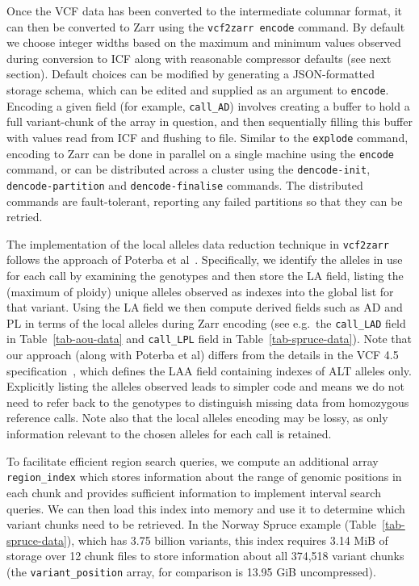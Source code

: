\documentclass[a4paper,num-refs]{oup-contemporary}
\begin{document}
Once the VCF data has been converted to the intermediate columnar format,
it can then be converted to Zarr using the \texttt{vcf2zarr encode}
command. By default we choose integer widths based on the maximum
and minimum values observed during conversion to ICF
along with reasonable compressor defaults (see next section).
Default choices can be
modified by generating a JSON-formatted storage schema,
which can be edited and supplied as an argument to \texttt{encode}.
Encoding a given field (for example, \texttt{call\_AD})
involves creating a buffer to hold a full variant-chunk of the
array in question, and then sequentially filling this buffer with
values read from ICF and flushing to file.
 Similar to the \texttt{explode} command,
encoding to Zarr can be done in parallel on a single
machine using the \texttt{encode} command,
or can be distributed across a cluster using the
\texttt{dencode-init},
\texttt{dencode-partition} and \texttt{dencode-finalise} commands.
The distributed commands are fault-tolerant, reporting any failed
partitions so that they can be retried.

The implementation of the local alleles data reduction technique 
in \texttt{vcf2zarr} follows the approach of Poterba 
et al~\cite{poterba2025scalable}.
Specifically, we identify the alleles in use for each call by
examining the genotypes and then store the LA field,
listing the (maximum of ploidy) unique alleles observed as indexes into the 
global list for that variant.
Using the LA field we then compute derived fields such as 
AD and PL in terms of the local alleles during Zarr encoding
(see e.g.\ the \texttt{call\_LAD} field in Table~\ref{tab-aou-data}
and
\texttt{call\_LPL} field in Table~\ref{tab-spruce-data}).
Note that our approach (along with Poterba et al)
differs from the details in the VCF 4.5 specification~\citep{vcf4_5},
which defines the LAA field containing indexes of ALT 
alleles only. Explicitly listing the alleles observed leads
to simpler code and means we do not need to refer back to the 
genotypes to distinguish missing data from homozygous reference 
calls. Note also that the local alleles encoding may be lossy,
as only information relevant to the chosen alleles for 
each call is retained.

To facilitate efficient region search queries, we compute an
additional array \texttt{region\_index} which stores information
about the range of genomic positions in each chunk
and provides sufficient information to implement interval
search queries. We can then load this index into memory and 
use it to determine which variant chunks need to be retrieved.
In the Norway Spruce example (Table~\ref{tab-spruce-data}),
which has 3.75 billion variants,
this index requires 3.14 MiB of storage over 12 chunk files
to store information about all 
374,518 variant chunks 
(the \texttt{variant\_position} array, for comparison 
is 13.95 GiB uncompressed).
\end{document}
